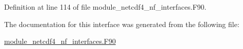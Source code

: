 Definition at line 114 of file module\+\_\+netcdf4\+\_\+nf\+\_\+interfaces.\+F90.



The documentation for this interface was generated from the following file\+:\begin{DoxyCompactItemize}
\item 
\hyperlink{module__netcdf4__nf__interfaces_8F90}{module\+\_\+netcdf4\+\_\+nf\+\_\+interfaces.\+F90}\end{DoxyCompactItemize}
